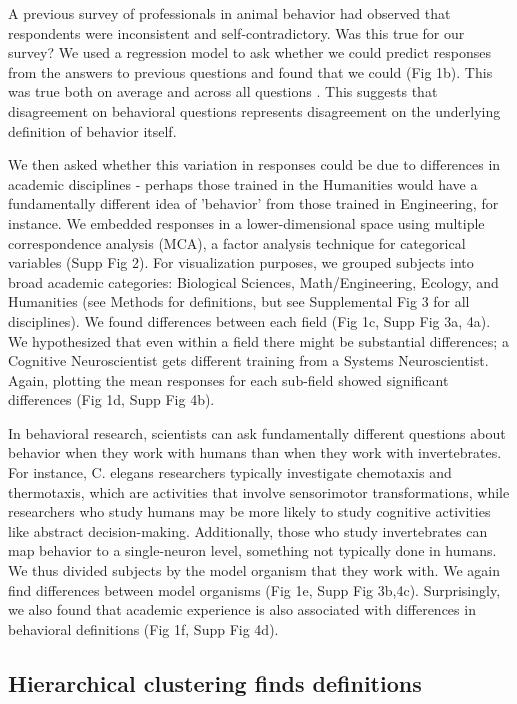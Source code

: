 \documentclass[a4paper, 11pt]{article}
\begin{document}
A previous survey of professionals in animal behavior\cite{levitis2009behavioural} had observed that respondents were inconsistent and self-contradictory. Was this true for our survey? We used a regression model to ask whether we could predict responses from the answers to previous questions and found that we could (Fig 1b). This was true both on average and across all questions . This suggests that disagreement on behavioral questions represents disagreement on the underlying definition of behavior itself.

We then asked whether this variation in responses could be due to differences in academic disciplines - perhaps those trained in the Humanities would have a fundamentally different idea of 'behavior' from those trained in Engineering, for instance. We embedded responses in a lower-dimensional space using multiple correspondence analysis (MCA), a factor analysis technique for categorical variables \cite{le2010multiple} (Supp Fig 2). For visualization purposes, we grouped subjects into broad academic categories: Biological Sciences, Math/Engineering, Ecology, and Humanities (see Methods for definitions, but see Supplemental Fig 3 for all disciplines). We found differences between each field (Fig 1c, Supp Fig 3a, 4a). We  hypothesized that even within a field there might be substantial differences; a Cognitive Neuroscientist gets different training from a Systems Neuroscientist. Again, plotting the mean responses for each sub-field showed significant differences (Fig 1d, Supp Fig 4b).

In behavioral research, scientists can ask fundamentally different questions about behavior when they work with humans than when they work with invertebrates. For instance, C. elegans researchers typically investigate chemotaxis and thermotaxis, which are activities that involve sensorimotor transformations, while researchers who study humans may be more likely to study cognitive activities like abstract decision-making. Additionally, those who study invertebrates can map behavior to a single-neuron level, something not typically done in humans.  We thus divided subjects by the model organism that they work with. We again find differences between model organisms (Fig 1e, Supp Fig 3b,4c). Surprisingly, we also found that academic experience is also associated with differences in behavioral definitions (Fig 1f, Supp Fig 4d).



\subsection*{Hierarchical clustering finds definitions}
\end{document}
